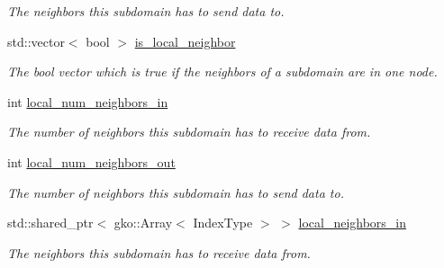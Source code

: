\begin{DoxyCompactItemize}
\begin{DoxyCompactList}\small\item\em The neighbors this subdomain has to send data to. \end{DoxyCompactList}\item 
std\+::vector$<$ bool $>$ \hyperlink{structSchwarzWrappers_1_1Communicate_1_1comm__struct_a74f06e0065566a34f53343dbf6805705}{is\+\_\+local\+\_\+neighbor}
\begin{DoxyCompactList}\small\item\em The bool vector which is true if the neighbors of a subdomain are in one node. \end{DoxyCompactList}\item 
\mbox{\label{structSchwarzWrappers_1_1Communicate_1_1comm__struct_a8ce2b8f7ed8825e1a4b20fde1982d8f9}} 
int \hyperlink{structSchwarzWrappers_1_1Communicate_1_1comm__struct_a8ce2b8f7ed8825e1a4b20fde1982d8f9}{local\+\_\+num\+\_\+neighbors\+\_\+in}
\begin{DoxyCompactList}\small\item\em The number of neighbors this subdomain has to receive data from. \end{DoxyCompactList}\item 
\mbox{\label{structSchwarzWrappers_1_1Communicate_1_1comm__struct_afd189e9e764e8debffedafa1745be978}} 
int \hyperlink{structSchwarzWrappers_1_1Communicate_1_1comm__struct_afd189e9e764e8debffedafa1745be978}{local\+\_\+num\+\_\+neighbors\+\_\+out}
\begin{DoxyCompactList}\small\item\em The number of neighbors this subdomain has to send data to. \end{DoxyCompactList}\item 
\mbox{\label{structSchwarzWrappers_1_1Communicate_1_1comm__struct_aaa0b408f82374156e9a03aa124360a8c}} 
std\+::shared\+\_\+ptr$<$ gko\+::\+Array$<$ Index\+Type $>$ $>$ \hyperlink{structSchwarzWrappers_1_1Communicate_1_1comm__struct_aaa0b408f82374156e9a03aa124360a8c}{local\+\_\+neighbors\+\_\+in}
\begin{DoxyCompactList}\small\item\em The neighbors this subdomain has to receive data from. \end{DoxyCompactList}\item 

\end{DoxyCompactItemize}

